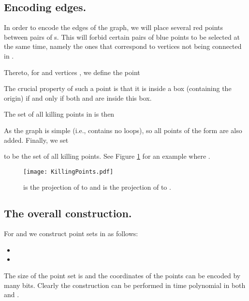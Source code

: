 \documentclass[12pt]{article}
\begin{document}
\subsection{Encoding edges.}
In order to encode the edges of the graph, we will place several red points
between pairs of s. This will forbid certain pairs of blue points to be
selected at the same time, namely the ones that correspond to vertices not being connected in .

Thereto, for 
and vertices , we define the point

The crucial property of such a point is that it is inside a box (containing the origin) if and only if both  and  are inside this box.

The set of all killing points in  is then
 
As the graph is simple (i.e., contains no loops), so all
points of the form  are also added. Finally, we set

to be the set of all killing points. See Figure \ref{fig:KillingPoints} for an example where .
\begin{figure}[htbp]
	\centering
		\texttt{[image: KillingPoints.pdf]}
	\caption{ is the projection of  to  and  is the projection of  to .}
	\label{fig:KillingPoints}
\end{figure}

\subsection{The overall construction.}
For  and  we construct point sets 
in  as follows:
\begin{itemize}
\item 
\item 
\end{itemize}
The size of the point set is  and the coordinates of the
points can be encoded by  many bits.  Clearly the construction
can be performed in time polynomial in both  and .
\end{document}
